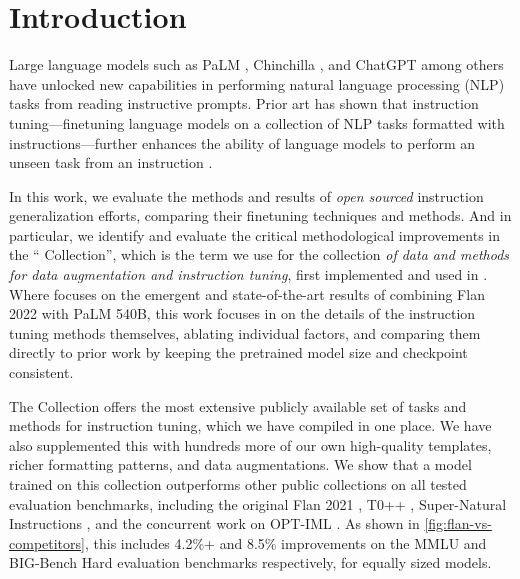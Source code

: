 \section{Introduction}

Large language models such as PaLM \citep{chowdhery2022palm}, Chinchilla \citep{hoffmann2022training}, and ChatGPT among others \citep{brown2020language,ouyang2022training} have unlocked new capabilities in performing natural language processing (NLP) tasks from reading instructive prompts.
Prior art has shown that instruction tuning---finetuning language models on a collection of NLP tasks formatted with instructions---further enhances the ability of language models to perform an unseen task from an instruction \citep{wei2021finetuned, sanh2021multitask, min-etal-2022-metaicl}.

In this work, we evaluate the methods and results of \emph{open sourced} instruction generalization efforts, comparing their finetuning techniques and methods.
And in particular, we identify and evaluate the critical methodological improvements in the ``\flantwo{} Collection'', which is the term we use for the collection \emph{of data and methods for data augmentation and instruction tuning}, first implemented and used in \citet{chung2022scaling}.
Where \citet{chung2022scaling} focuses on the emergent and state-of-the-art results of combining Flan 2022 with PaLM 540B, this work focuses in on the details of the instruction tuning methods themselves, ablating individual factors, and comparing them directly to prior work by keeping the pretrained model size and checkpoint consistent.

The \flantwo{} Collection offers the most extensive publicly available set of tasks and methods for instruction tuning, which we have compiled in one place.
We have also supplemented this with hundreds more of our own high-quality templates, richer formatting patterns, and data augmentations.
We show that a model trained on this collection outperforms other public collections on all tested evaluation benchmarks, including the original Flan 2021 \citep{wei2021finetuned}, T0++ \citep{sanh2021multitask}, Super-Natural Instructions \citep{wang2022benchmarking}, and the concurrent work on OPT-IML \citep{iyer2022optiml}.
As shown in \cref{fig:flan-vs-competitors}, this includes 4.2\%+ and 8.5\% improvements on the MMLU \citep{hendrycks2020measuring} and BIG-Bench Hard \citep{suzgun2022challenging} evaluation benchmarks respectively, for equally sized models.

